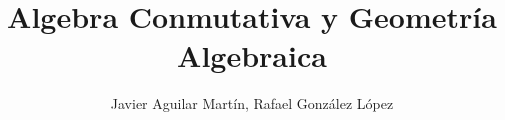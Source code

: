 \documentclass[twoside]{article}
\begin{document}
\title{Algebra Conmutativa y Geometría Algebraica}
\author{Javier Aguilar Martín, Rafael González López}
\maketitle

%
%
%
%
\end{document}

